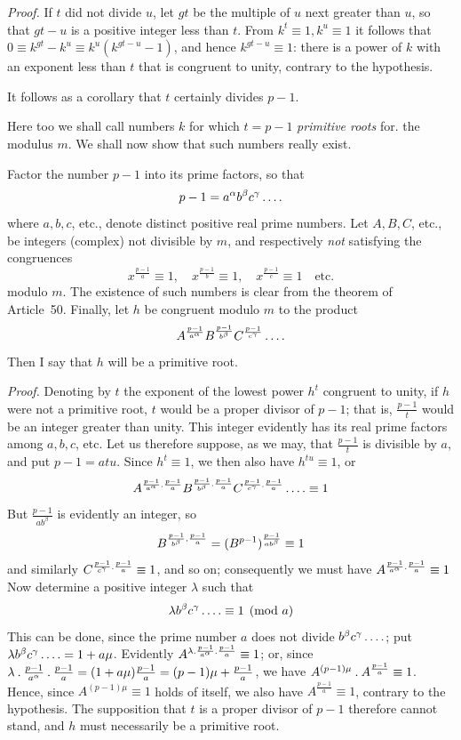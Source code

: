 %
\emph{Proof.} If $t$ did not divide $u$, let $gt$ be the multiple of $u$ next greater than $u$, so that $gt-u$ is a positive integer less than $t$. From $k^t\equiv1,k^u\equiv1$ it follows that $0\equiv k^{gt}-k^u\equiv k^u(k^{gt-u}-1)$, and hence $k^{gt-u}\equiv1$: there is a power of $k$ with an exponent less than $t$ that is congruent to unity, contrary to the hypothesis.

It follows as a corollary that $t$ certainly divides $p-1$.

Here too we shall call numbers $k$ for which $t=p-1$ \emph{primitive roots} for. the modulus $m$. We shall now show that such numbers really exist.

Factor the number $p-1$ into its prime factors, so that
\[
p-1=a^\alpha b^\beta c^\gamma\mathinner{.\,.\,.\,.}
\]
where $a,b,c$, etc., denote distinct positive real prime numbers. Let $A,B,C$, etc., be integers (complex) not divisible by $m$, and respectively \emph{not} satisfying the congruences
\[
x^{\frac{p-1}a}\equiv1,\quad x^{\frac{p-1}b}\equiv1,\quad x^{\frac{p-1}c}\equiv1\quad\text{etc.}
\]
modulo $m$. The existence of such numbers is clear from the theorem of Article~50. Finally, let $h$ be congruent modulo $m$ to the product
\[
A^{\frac{p-1}{a^\alpha}}B^{\frac{p-1}{b^\beta}}C^{\frac{p-1}{c^\gamma}}\mathinner{.\,.\,.\,.}
\]
Then I say that $h$ will be a primitive root.

\emph{Proof.} Denoting by $t$ the exponent of the lowest power $h^t$ congruent to unity, if $h$ were not a primitive root, $t$ would be a proper divisor of $p-1$; that is, $\frac{p-1}t$ would be an integer greater than unity. This integer evidently has its real prime factors among $a,b,c$, etc. Let us therefore suppose, as we may, that $\frac{p-1}t$ is divisible by $a$, and put $p-1=atu$. Since $h^t\equiv1$, we then also have $h^{tu}\equiv1$, or
\[
A^{\frac{p-1}{a^\alpha}\mathbin{.}\frac{p-1}a}B^{\frac{p-1}{b^\beta}\mathbin{.}\frac{p-1}a}C^{\frac{p-1}{c^\gamma}\mathbin{.}\frac{p-1}a}\mathinner{.\,.\,.\,.}\equiv1
\]
But $\frac{p-1}{ab^\beta}$ is evidently an integer, so
\[
B^{\frac{p-1}{b^\beta}\mathbin{.}\frac{p-1}a}=(B^{p-1})^{\frac{p-1}{ab^\beta}}\equiv1
\]
and similarly
%
$C^{\frac{p-1}{c^\gamma}\mathbin{.}\frac{p-1}a}\equiv1$, and so on; consequently we must have \mbox{$A^{\frac{p-1}{a^\alpha}\mathbin{.}\frac{p-1}a}\equiv1$}
Now determine a positive integer $\lambda$ such that
\[
\lambda b^\beta c^\gamma\mathinner{.\,.\,.\,.}\equiv1\pmod a
\]
This can be done, since the prime number $a$ does not divide $b^\beta c^\gamma\mathinner{.\,.\,.\,.}$; put $\lambda b^\beta c^\gamma\mathinner{.\,.\,.\,.}=1+a\mu$. Evidently $A^{\lambda\mathbin{.}\frac{p-1}{a^\alpha}\mathbin{.}\frac{p-1}a}\equiv1$; or, since $\lambda\mathbin{.}\frac{p-1}{a^\alpha}\mathbin{.}\frac{p-1}a=(1+a\mu)\frac{p-1}a=(p-1)\mu+\frac{p-1}a$, we have $A^{(p-1)\mu}\mathbin{.} A^{\frac{p-1}a}\equiv1$. Hence, since $A^{(p-1)\mu}\equiv1$ holds of itself, we also have $A^{\frac{p-1}a}\equiv1$, contrary to the hypothesis. The supposition that $t$ is a proper divisor of $p-1$ therefore cannot stand, and $h$ must necessarily be a primitive root.

